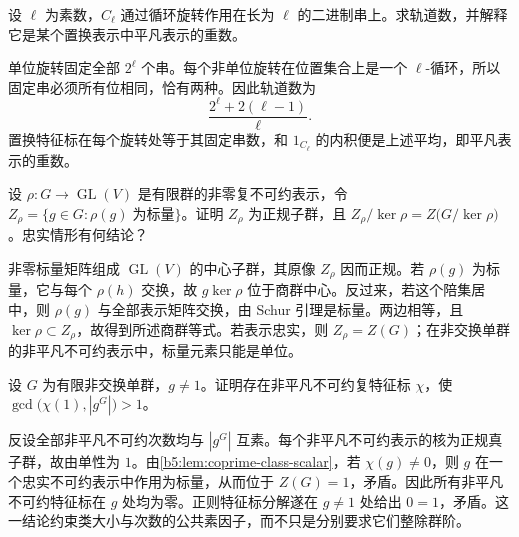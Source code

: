 \begin{exercise}\label{b5:ex:05-necklace-count}
	设 \(\ell\) 为素数，\(C_\ell\) 通过循环旋转作用在长为 \(\ell\) 的二进制串上。求轨道数，并解释它是某个置换表示中平凡表示的重数。
\end{exercise}
\begin{solution}
	单位旋转固定全部 \(2^\ell\) 个串。每个非单位旋转在位置集合上是一个 \(\ell\)-循环，所以固定串必须所有位相同，恰有两种。因此轨道数为
	\[
		\frac{2^\ell+2(\ell-1)}{\ell}.
	\]
	置换特征标在每个旋转处等于其固定串数，和 \(1_{C_\ell}\) 的内积便是上述平均，即平凡表示的重数。
\end{solution}

\begin{exercise}\label{b5:ex:05-scalar-subgroup}
	设 \(\rho:G\rightarrow\operatorname{GL}(V)\) 是有限群的非零复不可约表示，令 \(Z_\rho=\bigl\{g\in G:\rho(g)\;\text{为标量}\bigr\}\)。证明 \(Z_\rho\) 为正规子群，且 \(Z_\rho/\ker\rho=Z\bigl(G/\ker\rho\bigr)\)。忠实情形有何结论？
\end{exercise}
\begin{solution}
	非零标量矩阵组成 \(\operatorname{GL}(V)\) 的中心子群，其原像 \(Z_\rho\) 因而正规。若 \(\rho(g)\) 为标量，它与每个 \(\rho(h)\) 交换，故 \(g\ker\rho\) 位于商群中心。反过来，若这个陪集居中，则 \(\rho(g)\) 与全部表示矩阵交换，由 Schur 引理是标量。两边相等，且 \(\ker\rho\subset Z_\rho\)，故得到所述商群等式。若表示忠实，则 \(Z_\rho=Z(G)\)；在非交换单群的非平凡不可约表示中，标量元素只能是单位。
\end{solution}

\begin{exercise}\label{b5:ex:05-simple-character-constraint}
	设 \(G\) 为有限非交换单群，\(g\ne1\)。证明存在非平凡不可约复特征标 \(\chi\)，使 \(\gcd\bigl(\chi(1),|g^G|\bigr)>1\)。
\end{exercise}
\begin{solution}
	反设全部非平凡不可约次数均与 \(|g^G|\) 互素。每个非平凡不可约表示的核为正规真子群，故由单性为 \(1\)。由\cref{b5:lem:coprime-class-scalar}，若 \(\chi(g)\ne0\)，则 \(g\) 在一个忠实不可约表示中作用为标量，从而位于 \(Z(G)=1\)，矛盾。因此所有非平凡不可约特征标在 \(g\) 处均为零。正则特征标分解遂在 \(g\ne1\) 处给出 \(0=1\)，矛盾。这一结论约束类大小与次数的公共素因子，而不只是分别要求它们整除群阶。
\end{solution}
